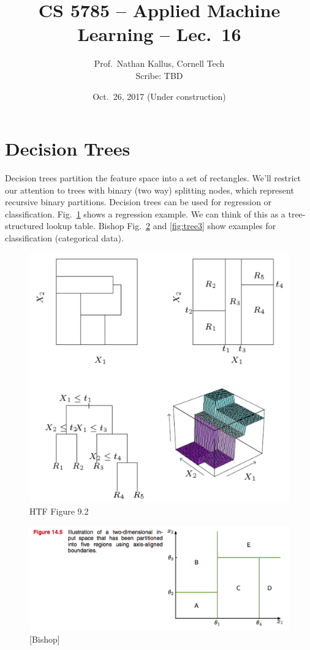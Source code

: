 \documentclass[a4paper]{article}
\title{CS 5785 -- Applied Machine Learning -- Lec.\ 16}
\author{Prof.\ Nathan Kallus, Cornell Tech\\Scribe: TBD}
\date{Oct.\ 26, 2017 (Under construction)}
\begin{document}
\maketitle

\section{Decision Trees}

Decision trees partition the feature space into a set of rectangles.  We'll restrict our attention to trees with binary (two way) splitting nodes, which represent recursive binary partitions.  Decision trees can be used for regression or classification.  Fig.~\ref{fig:tree1} shows a regression example.  We can think of this as a tree-structured lookup table.  Bishop Fig.~\ref{fig:tree2} and \ref{fig:tree3} show examples for classification (categorical data).

\begin{figure}
\centering
\includegraphics[width=1.0\textwidth]{fig9_2.png}
\caption{\label{fig:tree1}HTF Figure 9.2}
\end{figure}

\begin{figure}
\centering
\includegraphics[width=1.0\textwidth]{fig14_5.png}
\caption{\label{fig:tree2}[Bishop]}
\end{figure}
\end{document}
